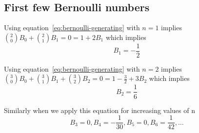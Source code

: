 \documentclass[a4paper]{article}
\begin{document}
    \subsection{First few Bernoulli numbers}\label{subsec:first-few-bernoulli-numbers}
    Using equation~\ref{eq:bernoulli-generating} with $n=1$ implies $ \binom{2}{0} B_0 + \binom{2}{1} B_1 = 0 = 1 + 2 B_1 $ which implies
    \begin{equation}
        B_1 = -\frac{1}{2}\label{eq:equation}
    \end{equation}

    Using equation~\ref{eq:bernoulli-generating} with $n=2$ implies $ \binom{3}{0} B_0 + \binom{3}{1} B_1 + \binom{3}{2} B_2 = 0 = 1 - \frac{3}{2} + 3 B_2 $ which implies
    \begin{equation}
        B_2 = \frac{1}{6}\label{eq:equation2}
    \end{equation}

    Similarly when we apply this equation for increasing values of n
    \begin{equation}
        B_3 = 0, B_4 = -\frac{1}{30}, B_5 = 0, B_6 = \frac{1}{42}, \dots \label{eq:equation3}
    \end{equation}
\end{document}
